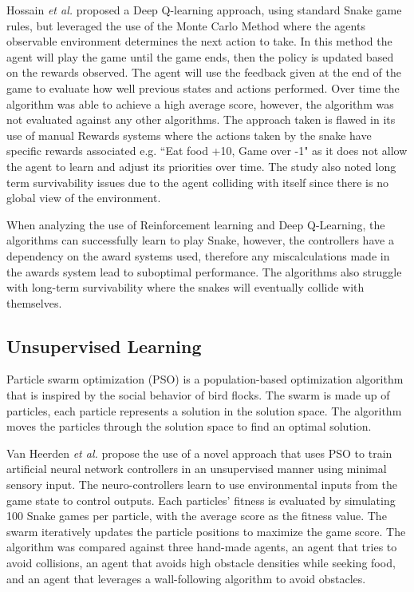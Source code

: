 \documentclass[a4paper,12pt]{article}
\begin{document}
Hossain \textit{et al.} \cite{Reinforcement2} proposed a Deep Q-learning approach, using standard Snake game rules, but leveraged the use of the Monte Carlo Method \cite{MonteCarlo} where the agents observable environment determines the next action to take.
In this method the agent will play the game until the game ends, then the policy is updated based on the rewards observed.
The agent will use the feedback given at the end of the game to evaluate how well previous states and actions performed.
Over time the algorithm was able to achieve a high average score, however, the algorithm was not evaluated against any other algorithms.
The approach taken is flawed in its use of manual Rewards systems where the actions taken by the snake have specific rewards associated 
e.g. ``Eat food +10, Game over -1" as it does not allow the agent to learn and adjust its priorities over time. The study also noted long term survivability issues
due to the agent colliding with itself since there is no global view of the environment.

When analyzing the use of Reinforcement learning and Deep Q-Learning, the algorithms can successfully learn to play Snake, however, the controllers have a dependency on the award systems used, therefore any miscalculations made in
the awards system lead to suboptimal performance. The algorithms also struggle with long-term survivability \cite{Reinforcement2} \cite{Reinforcement6} where the snakes will eventually collide with themselves.

\subsection{Unsupervised Learning}
Particle swarm optimization (PSO) \cite{PSOs} is a population-based optimization algorithm that is inspired by the social behavior of bird flocks.
The swarm is made up of particles, each particle represents a solution in the solution space.
The algorithm moves the particles through the solution space to find an optimal solution.

Van Heerden \textit{et al.} \cite{Unsupervised1} propose the use of a novel approach that uses PSO to train artificial neural network controllers in an unsupervised manner using minimal sensory input.
The neuro-controllers learn to use environmental inputs from the game state to control outputs.
Each particles' fitness is evaluated by simulating 100 Snake games per particle, with the average score as the fitness value.
The swarm iteratively updates the particle positions to maximize the game score.
The algorithm was compared against three hand-made agents, an agent that tries to avoid collisions, an agent that avoids high obstacle densities while seeking food,
and an agent that leverages a wall-following algorithm to avoid obstacles. 
\end{document}
